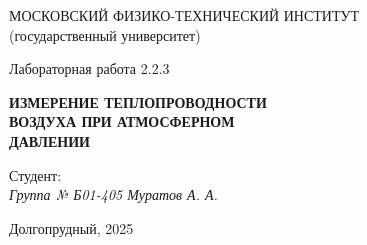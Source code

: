\thispagestyle{empty}

\begin{center}
    МОСКОВСКИЙ ФИЗИКО-ТЕХНИЧЕСКИЙ ИНСТИТУТ \\
    (государственный университет)
\end{center}

\vfill

\begin{center}
    Лабораторная работа 2.2.3 \\ 
    \vspace{20pt}
    
    \textbf{ИЗМЕРЕНИЕ ТЕПЛОПРОВОДНОСТИ} \\
    \textbf{ВОЗДУХА ПРИ АТМОСФЕРНОМ} \\
    \textbf{ДАВЛЕНИИ}
\end{center}  

\vfill

    \noindent Студент: \\
    \textit{Группа № Б01-405 \hfill Муратов А. А.}

\vfill

\begin{center}
    Долгопрудный, 2025
\end{center}